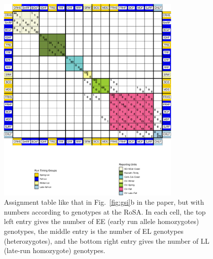 \begin{figure}
\begin{center}
\includegraphics[width=0.8\textwidth]{images/rosa-gsi-table-crop.pdf}
\end{center}
\caption[Assignment table by RoSA genotype]{\footnotesize Assignment table
like that in Fig.~\ref{fig:gsi}b in the paper, but with numbers according to genotypes
at the RoSA. In each cell, the top left entry gives the number of EE (early run allele homozygotes)
genotypes, the middle entry is the number of EL genotypes (heterozygotes), and the bottom
right entry gives the number of LL (late-run homozygote) genotypes. }
\label{fig:rosa-gsi}
\end{figure}



